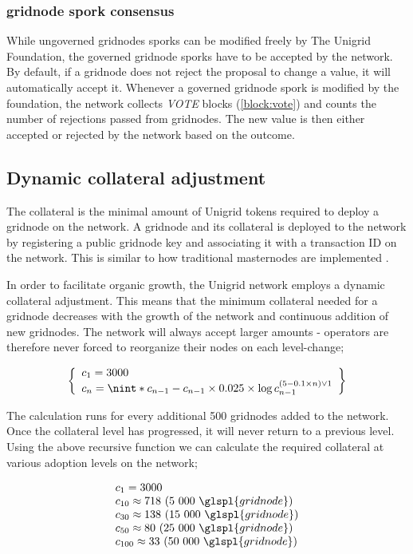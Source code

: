 \documentclass[10pt,a4paper,final]{article}
\DeclarePairedDelimiter{\nint}\lfloor\rceil
\begin{document}
\subsubsection{\Gls{gridnode} spork consensus}
While ungoverned \glspl{gridnode} sporks can be modified freely by The Unigrid Foundation, the governed \gls{gridnode} sporks have to be accepted by the network. By default, if a \gls{gridnode} does not reject the proposal to change a value, it will automatically accept it. Whenever a governed \gls{gridnode} spork is modified by the foundation, the network collects \emph{VOTE} blocks (\ref{block:vote}) and counts the number of rejections passed from gridnodes. The new value is then either accepted or rejected by the network based on the outcome.

\subsection{Dynamic collateral adjustment}
\label{section:dyncol}
The collateral is the minimal amount of Unigrid tokens required to deploy a \gls{gridnode} on the network. A \gls{gridnode} and its collateral is deployed to the network by registering a public \gls{gridnode} key and associating it with a transaction ID on the network. This is similar to how traditional masternodes are implemented \cite{darkcoin2014}.

In order to facilitate organic growth, the Unigrid network employs a dynamic collateral adjustment. This means that the minimum collateral needed for a \gls{gridnode} decreases with the growth of the network and continuous addition of new \glspl{gridnode}. The network will always accept larger amounts - operators are therefore never forced to reorganize their nodes on each level-change;

\[
	\left\{
		\begin{array}{l}
		c_1 = 3000\\
		c_n = \nint*{ c_{n - 1} - c_{n - 1} \times 0.025 \times \log c_{n - 1}^{(5 - 0.1  \times n) \vee 1} }\\
		\end{array}
	\right\}
\]

\noindent The calculation runs for every additional 500 \glspl{gridnode} added to the network. Once the collateral level has progressed, it will never return to a previous level. Using the above recursive function we can calculate the required collateral at various adoption levels on the network;

\[
	\begin{array}{l}
	c_1 = 3000\\
	c_{10} \approx 718\ (5\ 000\ \glspl{gridnode})\\
	c_{30} \approx 138\ (15\ 000\ \glspl{gridnode})\\
	c_{50} \approx 80\ (25\ 000\ \glspl{gridnode})\\
	c_{100} \approx 33\ (50\ 000\ \glspl{gridnode})
	\end{array}
\]
\end{document}
